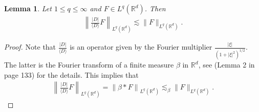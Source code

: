 \documentclass[a4paper, reqno, 11pt]{amsart}
\newtheorem{lemma}[theorem]{Lemma}
\newtheorem{remark}[theorem]{Remark}
\theoremstyle{definition}
\begin{document}
\begin{lemma}\label{lemma:bdd-finitemeasure}
Let $1 \leq q \leq \infty$ and $F \in L^q(\mathbb{R}^d)$. Then
\begin{align*}
\left\| \frac{|D|}{\langle D \rangle} F \right\|_{L^q(\mathbb{R}^d)} \lesssim \|F\|_{L^q(\mathbb{R}^d)}.
\end{align*}
\end{lemma}
\begin{proof}
Note that $\frac{|D|}{\langle D \rangle}$ is an operator given by the Fourier multiplier $\frac{|\xi|}{(1 + |\xi|^2)^{1/2}}$. The latter is the Fourier transform of a finite measure $\beta$ in $\mathbb{R}^d$, see \cite{S70} (Lemma 2 in page 133) for the details. This implies that
\begin{align*}
\left\| \frac{|D|}{\langle D \rangle} F \right\|_{L^q(\mathbb{R}^d)} = \left\| \beta \ast F \right\|_{L^q(\mathbb{R}^d)} \lesssim_{\beta} \|F\|_{L^q(\mathbb{R}^d)}.
\end{align*}
\end{proof}

\end{document}
